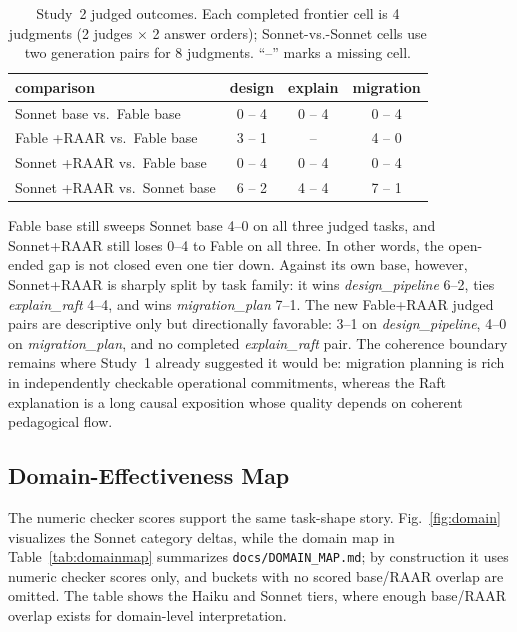 \documentclass[journal]{IEEEtran}
\newcommand{\method}{RAAR}
\begin{document}
\begin{table}[t]
\caption{Study~2 judged outcomes. Each completed frontier cell is 4
judgments (2 judges $\times$ 2 answer orders); Sonnet-vs.-Sonnet cells use
two generation pairs for 8 judgments. ``--'' marks a missing cell.}
\label{tab:judged-v2}
\centering
\footnotesize
\setlength{\tabcolsep}{3pt}
\begin{tabular}{lccc}
\toprule
comparison & design & explain & migration \\
\midrule
Sonnet base vs.\ Fable base & 0 -- 4 & 0 -- 4 & 0 -- 4 \\
Fable +\method{} vs.\ Fable base & 3 -- 1 & -- & 4 -- 0 \\
Sonnet +\method{} vs.\ Fable base & 0 -- 4 & 0 -- 4 & 0 -- 4 \\
Sonnet +\method{} vs.\ Sonnet base & 6 -- 2 & 4 -- 4 & 7 -- 1 \\
\bottomrule
\end{tabular}
\end{table}

Fable base still sweeps Sonnet base 4--0 on all three judged tasks, and
Sonnet+\method{} still loses 0--4 to Fable on all three. In other words,
the open-ended gap is not closed even one tier down. Against its own base,
however, Sonnet+\method{} is sharply split by task family: it wins
\emph{design\_pipeline} 6--2, ties \emph{explain\_raft} 4--4, and wins
\emph{migration\_plan} 7--1. The new Fable+\method{} judged pairs are
descriptive only but directionally favorable: 3--1 on
\emph{design\_pipeline}, 4--0 on \emph{migration\_plan}, and no completed
\emph{explain\_raft} pair. The coherence boundary remains where Study~1
already suggested it would be: migration planning is rich in independently
checkable operational commitments, whereas the Raft explanation is a long
causal exposition whose quality depends on coherent pedagogical flow.

\subsection{Domain-Effectiveness Map}
\label{sec:study2-domain}
The numeric checker scores support the same task-shape story. Fig.~\ref{fig:domain}
visualizes the Sonnet category deltas, while the domain map in
Table~\ref{tab:domainmap} summarizes
\texttt{docs/DOMAIN\_MAP.md}; by construction it uses numeric checker scores
only, and buckets with no scored base/RAAR overlap are omitted. The table
shows the Haiku and Sonnet tiers, where enough base/RAAR overlap exists for
domain-level interpretation.
\end{document}
